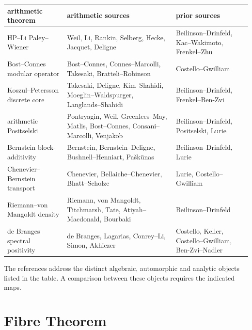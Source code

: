 \begin{center}
\tiny
\begin{tabular}{p{}|p{}|p{}}
arithmetic theorem & arithmetic sources & prior sources \\
\hline
HP--Li Paley--Wiener &
Weil, Li, Rankin, Selberg, Hecke, Jacquet, Deligne &
Beilinson--Drinfeld, Kac--Wakimoto, Frenkel--Zhu \\
Bost--Connes modular operator &
Bost--Connes, Connes--Marcolli, Takesaki, Bratteli--Robinson &
Costello--Gwilliam \\
Koszul--Petersson discrete core &
Takesaki, Deligne, Kim--Shahidi, Moeglin--Waldspurger,
Langlands--Shahidi &
Beilinson--Drinfeld, Frenkel--Ben-Zvi \\
arithmetic Positselski &
Pontryagin, Weil, Greenlees--May, Matlis, Bost--Connes,
Consani--Marcolli, Venjakob &
Beilinson--Drinfeld, Positselski, Lurie \\
Bernstein block-additivity &
Bernstein, Bernstein--Deligne, Bushnell--Henniart, Pa{\v s}k{\=u}nas &
Beilinson--Drinfeld, Lurie \\
Chenevier--Bernstein transport &
Chenevier, Bellaiche--Chenevier, Bhatt--Scholze &
Lurie, Costello--Gwilliam \\
Riemann--von Mangoldt density &
Riemann, von Mangoldt, Titchmarsh, Tate, Atiyah--Macdonald, Bourbaki &
Beilinson--Drinfeld \\
de Branges spectral positivity &
de Branges, Lagarias, Conrey--Li, Simon, Akhiezer &
Costello, Keller, Costello--Gwilliam, Ben-Zvi--Nadler
\end{tabular}
\end{center}

The references address the distinct algebraic, automorphic and
analytic objects listed in the table. A comparison between these
objects requires the indicated maps.

\section{Fibre Theorem}
\label{v4-arith:w6-i:comparison}
\label{v4-arith:w6-i:extent-update}


